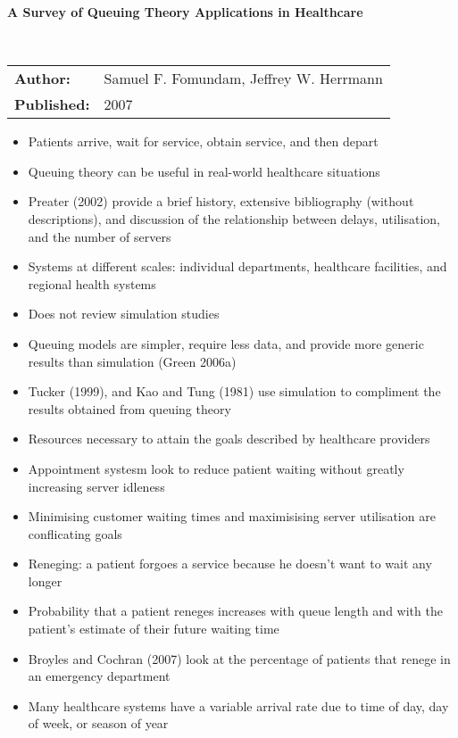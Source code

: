 \documentclass{article}
\begin{document}
\textbf{A Survey of Queuing Theory Applications in Healthcare}

\ \newline

\begin{tabular}{l l}
    \textbf{Author:} & Samuel F. Fomundam, Jeffrey W. Herrmann \\
    \textbf{Published:} & 2007 \\
\end{tabular}

\begin{itemize}
	\item Patients arrive, wait for service, obtain service, and then depart
    \item Queuing theory can be useful in real-world healthcare situations
    \item Preater (2002) provide a brief history, extensive bibliography (without descriptions), and discussion of the relationship between delays, utilisation, and the number of servers
    \item Systems at different scales: individual departments, healthcare facilities, and regional health systems
    \item Does not review simulation studies
    \item Queuing models are simpler, require less data, and provide more generic results than simulation (Green 2006a)
    \item Tucker (1999), and Kao and Tung (1981) use simulation to compliment the results obtained from queuing theory
    \item Resources necessary to attain the goals described by healthcare providers
    \item Appointment systesm look to reduce patient waiting without greatly increasing server idleness
    \item Minimising customer waiting times and maximisising server utilisation are conflicating goals
    \item Reneging: a patient forgoes a service because he doesn't want to wait any longer
    \item Probability that a patient reneges increases with queue length and with the patient's estimate of their future waiting time
    \item Broyles and Cochran (2007) look at the percentage of patients that renege in an emergency department
    \item Many healthcare systems have a variable arrival rate due to time of day, day of week, or season of year

\end{itemize}
\end{document}
